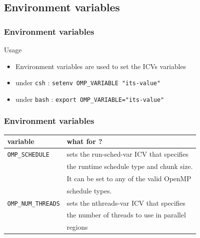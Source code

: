 \subsection{Environment variables}

\begin{frame}
\frametitle{Environment variables}
\begin{exampleblock}{Usage}
\begin{itemize}
\item{Environment variables are used to set the ICVs variables}
\item{under \texttt{csh} : \texttt{setenv OMP\_VARIABLE "its-value"}}
\item{under \texttt{bash} : \texttt{export OMP\_VARIABLE="its-value"}}
\end{itemize}
\end{exampleblock}
\end{frame}

\begin{frame}
\frametitle{Environment variables}

\begin{center}
\begin{tabular}{|l|l|}
\hline
  \textbf{variable} & \textbf{what for ?}  \\
\hline
\hline
\texttt{OMP\_SCHEDULE}
& sets the run-sched-var ICV that specifies \\
& the runtime schedule type and chunk size. \\
& It can be set to any of the valid OpenMP \\
& schedule types. \\
\hline

\texttt{OMP\_NUM\_THREADS}
& sets the nthreads-var ICV that specifies \\
& the number of threads to use in parallel  \\
& regions \\
\hline


\hline
\end{tabular}
\end{center}

\end{frame}

